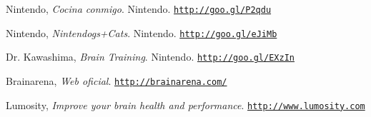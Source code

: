 \documentclass[12pt,a4paper]{article}
\begin{document}
\begin{thebibliography}{100}
  Nintendo,
  \emph{Cocina conmigo}.
  Nintendo. \href{http://goo.gl/P2qdu}{\tt http://goo.gl/P2qdu}

  Nintendo,
  \emph{Nintendogs+Cats}.
  Nintendo. \href{http://goo.gl/eJiMb}{\tt http://goo.gl/eJiMb}

  Dr. Kawashima,
  \emph{Brain Training}.
  Nintendo. \href{http://goo.gl/EXzIn}{\tt http://goo.gl/EXzIn}

  Brainarena,
  \emph{Web oficial}. \href{http://brainarena.com/}{\tt http://brainarena.com/}

  Lumosity,
  \emph{Improve your brain health and performance}. \href{http://www.lumosity.com}{\tt http://www.lumosity.com}


\end{thebibliography}




\end{document}
